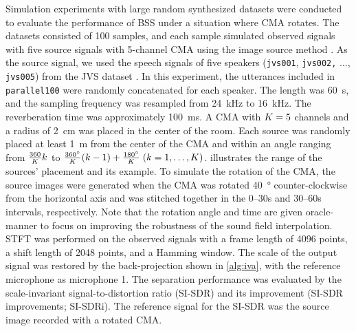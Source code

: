 \documentclass[sip,biber]{now-journal}
\begin{document}
Simulation experiments with large random synthesized datasets were conducted to evaluate the performance of BSS under a situation where CMA rotates.
The datasets consisted of 100 samples, and each sample simulated observed signals with five source signals with 5-channel CMA using the image source method \cite{Allen:1979:JASA}.
As the source signal, we used the speech signals of five speakers (\texttt{jvs001}, \texttt{jvs002,} $\hdots$, \texttt{jvs005}) from the JVS dataset \cite{Takamichi:2019:arxiv}.
In this experiment, the utterances included in \texttt{parallel100} were randomly concatenated for each speaker.
The length was \SI{60}{\second}, and the sampling frequency was resampled from \SI{24}{\kilo\hertz} to \SI{16}{\kilo\hertz}.
The reverberation time was approximately \SI{100}{\milli\second}.
A CMA with $K = 5$ channels and a radius of \SI{2}{\centi\metre} was placed in the center of the room.
Each source was randomly placed at least \SI{1}{\metre} from the center of the CMA and within an angle ranging from $\frac{360}{K} k$ to $\frac{360\si{\degree}}{K} (k - 1) + \frac{180\si{\degree}}{K}\; (k = 1, \dots, K)$.
 illustrates the range of the sources' placement and its example.
To simulate the rotation of the CMA, the source images were generated when the CMA was rotated \SI{40}{\degree} counter-clockwise from the horizontal axis and was stitched together in the 0--30\si{\second} and 30--60\si{\second} intervals, respectively.
Note that the rotation angle and time are given oracle-manner to focus on improving the robustness of the sound field interpolation.
STFT was performed on the observed signals with a frame length of 4096 points, a shift length of 2048 points, and a Hamming window.
The scale of the output signal was restored by the back-projection shown in \cref{alg:iva}, with the reference microphone as microphone 1.
The separation performance was evaluated by the scale-invariant signal-to-distortion ratio (SI-SDR) \cite{LeRoux:2019:ICASSP} and its improvement (SI-SDR improvements; SI-SDRi).
The reference signal for the SI-SDR was the source image recorded with a rotated CMA.
\end{document}
